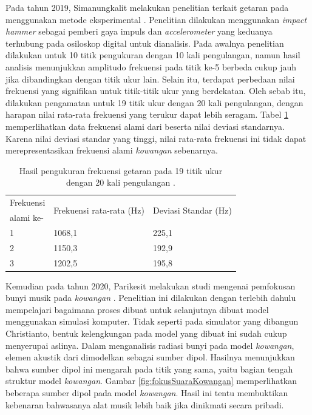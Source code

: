 Pada tahun 2019, Simanungkalit melakukan penelitian terkait getaran pada \kowangan menggunakan metode eksperimental \cite{skripsiSimanungkalit}. Penelitian dilakukan menggunakan \textit{impact hammer} sebagai pemberi gaya impuls dan \textit{accelerometer} yang keduanya terhubung pada osiloskop digital untuk dianalisis. Pada awalnya penelitian dilakukan untuk 10 titik pengukuran dengan 10 kali pengulangan, namun hasil analisis menunjukkan amplitudo frekuensi pada titik ke-5 berbeda cukup jauh jika dibandingkan dengan titik ukur lain. Selain itu, terdapat perbedaan nilai frekuensi yang signifikan untuk titik-titik ukur yang berdekatan. Oleh sebab itu, dilakukan pengamatan untuk 19 titik ukur dengan 20 kali pengulangan, dengan harapan nilai rata-rata frekuensi yang terukur dapat lebih seragam. Tabel \ref{tab:getaranKowangan} memperlihatkan data frekuensi alami dari \kowangan beserta nilai deviasi standarnya. Karena nilai deviasi standar yang tinggi, nilai rata-rata frekuensi ini tidak dapat merepresentasikan frekuensi alami \textit{kowangan} sebenarnya. \par 
\begin{table}[h!]
    \centering
    \caption{Hasil pengukuran frekuensi getaran \kowangan pada 19 titik ukur dengan 20 kali pengulangan \cite{skripsiSimanungkalit}.}
    \begin{tabular}{m{3 cm} l l}
        \hline
        Frekuensi & \multirow{2}{3cm}{Frekuensi rata-rata (Hz)} & \multirow{2}{3cm}{Deviasi Standar (Hz)} \\
        alami ke- & & \\
        \hline
        1 & 1068,1 & 225,1 \\
        2 & 1150,3 & 192,9 \\
        3 & 1202,5 & 195,8 \\
        \hline
    \end{tabular}
    \label{tab:getaranKowangan}
\end{table}
Kemudian pada tahun 2020, Parikesit melakukan studi mengenai pemfokusan bunyi musik \bundengan pada \textit{kowangan} \cite{alatMusikPersonal}. Penelitian ini dilakukan dengan terlebih dahulu mempelajari bagaimana proses \kowangan dibuat untuk selanjutnya dibuat model \kowangan menggunakan simulasi komputer. Tidak seperti pada simulator yang dibangun Christianto, bentuk kelengkungan \kowangan pada model yang dibuat ini sudah cukup menyerupai aslinya. Dalam menganalisis radiasi bunyi pada model \textit{kowangan}, elemen akustik dari \kowangan dimodelkan sebagai sumber dipol. Hasilnya menunjukkan bahwa sumber dipol ini mengarah pada titik yang sama, yaitu bagian tengah struktur model \textit{kowangan}. Gambar \ref{fig:fokusSuaraKowangan} memperlihatkan beberapa sumber dipol pada model \textit{kowangan}. Hasil ini tentu membuktikan kebenaran bahwasanya alat musik \bundengan lebih baik jika dinikmati secara pribadi.
